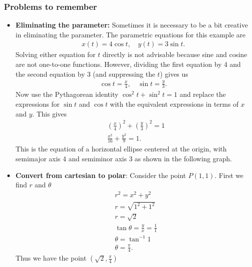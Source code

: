 \documentclass{report}
\begin{document}
    \subsubsection{Problems to remember}
    \begin{itemize}
        \item \textbf{Eliminating the parameter:}
            Sometimes it is necessary to be a bit creative in eliminating the parameter. The parametric equations for this example are
            \begin{align*}
                x(t) = 4\cos{t}, \quad y(t) = 3\sin{t}
            .\end{align*}
            \bigbreak \noindent 
            Solving either equation for $t$ directly is not advisable because sine and cosine are not one-to-one functions. However, dividing the first equation by 4 and the second equation by 3 (and suppressing the $t$) gives us
            \begin{align*}
                \cos{t} = \frac{x}{4}, \quad \sin{t} = \frac{y}{3}
            .\end{align*}
            \bigbreak \noindent 
            Now use the Pythagorean identity  $\cos^{2}{t} + \sin^{2}{t} = 1$ and replace the expressions for $\sin{t}$ and $\cos{t}$ with the equivalent expressions in terms of $x$ and $y$. This gives
            \begin{align*}
        &\left(\frac{x}{4}\right)^{2} +  \left(\frac{y}{3}\right)^{2} = 1 \\
        &\frac{x^{2}}{16}  + \frac{y^{2}}{9} = 1
    .\end{align*}
    \bigbreak \noindent 
    This is the equation of a horizontal ellipse centered at the origin, with semimajor axis 4 and semiminor axis 3 as shown in the following graph. 
    \item \textbf{Convert from cartesian to polar}: Consider the point $P(1,1)$. First we find $r$ and $\theta$
        \begin{align*}
            &r^{2} = x^{2} + y^{2} \\
            &r = \sqrt{1^{2} + 1^{2}} \\
            &r=\sqrt{2} \\
            &\tan{\theta } = \frac{y}{x} = \frac{1}{1} \\
            &\theta  = \tan^{-1}{1} \\
            &\theta  = \frac{\pi}{4}
        .\end{align*}
        Thus we have the point $\left(\sqrt{2}, \frac{\pi}{4}\right) $

\end{itemize}
\end{document}
